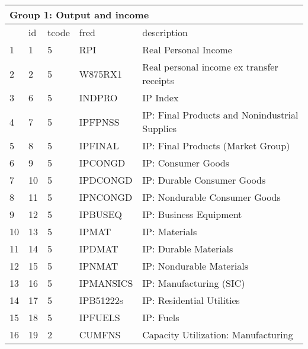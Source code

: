 \begin{table}[ht] 
\centering 
\begin{tabular}{lllll} 
\multicolumn{5}{l}{Group 1: Output and income} \\
\toprule
 & id & tcode & fred & description \\
\midrule
1 & 1 & 5 & RPI & Real Personal Income \\
2 & 2 & 5 & W875RX1 & Real personal income ex transfer receipts \\
3 & 6 & 5 & INDPRO & IP Index \\
4 & 7 & 5 & IPFPNSS & IP: Final Products and Nonindustrial Supplies \\
5 & 8 & 5 & IPFINAL & IP: Final Products (Market Group) \\
6 & 9 & 5 & IPCONGD & IP: Consumer Goods \\
7 & 10 & 5 & IPDCONGD & IP: Durable Consumer Goods \\
8 & 11 & 5 & IPNCONGD & IP: Nondurable Consumer Goods \\
9 & 12 & 5 & IPBUSEQ & IP: Business Equipment \\
10 & 13 & 5 & IPMAT & IP: Materials \\
11 & 14 & 5 & IPDMAT & IP: Durable Materials \\
12 & 15 & 5 & IPNMAT & IP: Nondurable Materials \\
13 & 16 & 5 & IPMANSICS & IP: Manufacturing (SIC) \\
14 & 17 & 5 & IPB51222s & IP: Residential Utilities \\
15 & 18 & 5 & IPFUELS & IP: Fuels \\
16 & 19 & 2 & CUMFNS & Capacity Utilization: Manufacturing \\
\bottomrule
\end{tabular}  
\end{table} 